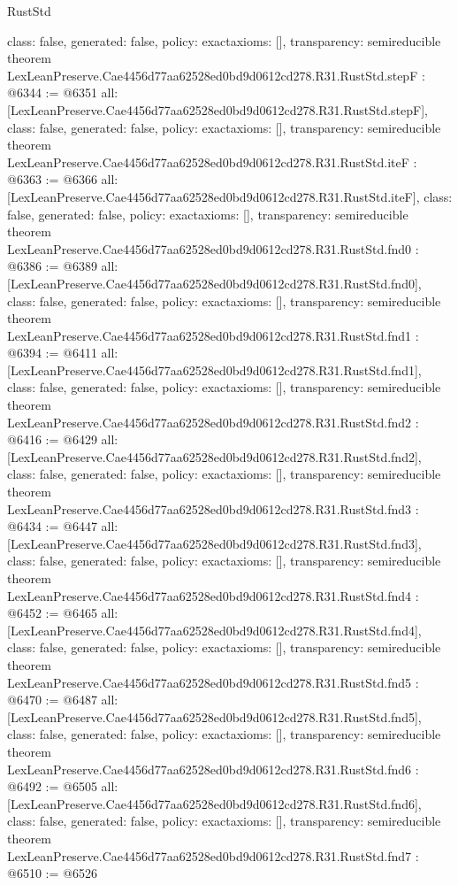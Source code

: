 \begin{lexlean}{RustStd}
\begin{coremodule}
{  class: false,
  generated: false,
  policy: exact{axioms: []},
  transparency: semireducible
}
theorem LexLeanPreserve.Cae4456d77aa62528ed0bd9d0612cd278.R31.RustStd.stepF : @6344 := @6351 {
  all: [LexLeanPreserve.Cae4456d77aa62528ed0bd9d0612cd278.R31.RustStd.stepF],
  class: false,
  generated: false,
  policy: exact{axioms: []},
  transparency: semireducible
}
theorem LexLeanPreserve.Cae4456d77aa62528ed0bd9d0612cd278.R31.RustStd.iteF : @6363 := @6366 {
  all: [LexLeanPreserve.Cae4456d77aa62528ed0bd9d0612cd278.R31.RustStd.iteF],
  class: false,
  generated: false,
  policy: exact{axioms: []},
  transparency: semireducible
}
theorem LexLeanPreserve.Cae4456d77aa62528ed0bd9d0612cd278.R31.RustStd.fnd0 : @6386 := @6389 {
  all: [LexLeanPreserve.Cae4456d77aa62528ed0bd9d0612cd278.R31.RustStd.fnd0],
  class: false,
  generated: false,
  policy: exact{axioms: []},
  transparency: semireducible
}
theorem LexLeanPreserve.Cae4456d77aa62528ed0bd9d0612cd278.R31.RustStd.fnd1 : @6394 := @6411 {
  all: [LexLeanPreserve.Cae4456d77aa62528ed0bd9d0612cd278.R31.RustStd.fnd1],
  class: false,
  generated: false,
  policy: exact{axioms: []},
  transparency: semireducible
}
theorem LexLeanPreserve.Cae4456d77aa62528ed0bd9d0612cd278.R31.RustStd.fnd2 : @6416 := @6429 {
  all: [LexLeanPreserve.Cae4456d77aa62528ed0bd9d0612cd278.R31.RustStd.fnd2],
  class: false,
  generated: false,
  policy: exact{axioms: []},
  transparency: semireducible
}
theorem LexLeanPreserve.Cae4456d77aa62528ed0bd9d0612cd278.R31.RustStd.fnd3 : @6434 := @6447 {
  all: [LexLeanPreserve.Cae4456d77aa62528ed0bd9d0612cd278.R31.RustStd.fnd3],
  class: false,
  generated: false,
  policy: exact{axioms: []},
  transparency: semireducible
}
theorem LexLeanPreserve.Cae4456d77aa62528ed0bd9d0612cd278.R31.RustStd.fnd4 : @6452 := @6465 {
  all: [LexLeanPreserve.Cae4456d77aa62528ed0bd9d0612cd278.R31.RustStd.fnd4],
  class: false,
  generated: false,
  policy: exact{axioms: []},
  transparency: semireducible
}
theorem LexLeanPreserve.Cae4456d77aa62528ed0bd9d0612cd278.R31.RustStd.fnd5 : @6470 := @6487 {
  all: [LexLeanPreserve.Cae4456d77aa62528ed0bd9d0612cd278.R31.RustStd.fnd5],
  class: false,
  generated: false,
  policy: exact{axioms: []},
  transparency: semireducible
}
theorem LexLeanPreserve.Cae4456d77aa62528ed0bd9d0612cd278.R31.RustStd.fnd6 : @6492 := @6505 {
  all: [LexLeanPreserve.Cae4456d77aa62528ed0bd9d0612cd278.R31.RustStd.fnd6],
  class: false,
  generated: false,
  policy: exact{axioms: []},
  transparency: semireducible
}
theorem LexLeanPreserve.Cae4456d77aa62528ed0bd9d0612cd278.R31.RustStd.fnd7 : @6510 := @6526 {
}
\end{coremodule}
\end{lexlean}
